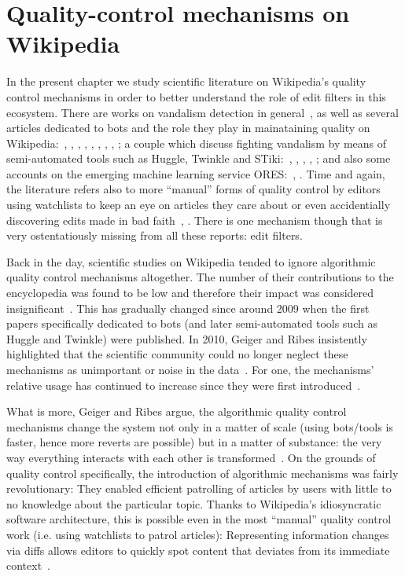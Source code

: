 \chapter{Quality-control mechanisms on Wikipedia}
\label{chap:background}

In the present chapter we study scientific literature on Wikipedia's quality control mechanisms in order to better understand the role of edit filters in this ecosystem.
There are works on vandalism detection in general~\cite{PotSteGer2008},
as well as several articles dedicated to bots and the role they play in mainataining quality on Wikipedia:~\cite{GeiHal2013}, \cite{Geiger2014}, \cite{GeiHal2017}, \cite{GeiRib2010}, \cite{HalRied2012}, \cite{Livingstone2016}, \cite{MueDoHer2013}, \cite{MuellerBirn2014}, \cite{Geiger2009};
a couple which discuss fighting vandalism by means of semi-automated tools such as Huggle, Twinkle and STiki:~\cite{GeiRib2010}, \cite{HalRied2012}, \cite{WestKanLee2010}, \cite{GeiHal2013}, \cite{Geiger2009};
and also some accounts on the emerging machine learning service ORES:~\cite{HalTar2015}, \cite{HalGeiMorSarWig2018}.
Time and again, the literature refers also to more ``manual'' forms of quality control by editors using watchlists to keep an eye on articles they care about or even accidentially discovering edits made in bad faith~\cite{Livingstone2016}, \cite{AstHal2018}.
There is one mechanism though that is very ostentatiously missing from all these reports: edit filters.

Back in the day, scientific studies on Wikipedia tended to ignore algorithmic quality control mechanisms altogether.
The number of their contributions to the encyclopedia was found to be low and therefore their impact was considered insignificant~\cite{KitChiBrySuhMyt2007}.
This has gradually changed since around 2009 when the first papers specifically dedicated to bots (and later semi-automated tools such as Huggle and Twinkle) were published.
In 2010, Geiger and Ribes insistently highlighted that the scientific community could no longer neglect these mechanisms as unimportant or noise in the data~\cite{GeiRib2010}.
For one, the mechanisms' relative usage has continued to increase since they were first introduced~\cite{Geiger2009}.

What is more, Geiger and Ribes argue, the algorithmic quality control mechanisms change the system not only in a matter of scale (using bots/tools is faster, hence more reverts are possible) but in a matter of substance: the very way everything interacts with each other is transformed~\cite{GeiRib2010}.
On the grounds of quality control specifically, the introduction of algorithmic mechanisms was fairly revolutionary:
They enabled efficient patrolling of articles by users with little to no knowledge about the particular topic.
Thanks to Wikipedia's idiosyncratic software architecture, this is possible even in the most ``manual'' quality control work (i.e. using watchlists to patrol articles):
Representing information changes via diffs allows editors to quickly spot content that deviates from its immediate context~\cite{GeiRib2010}.

